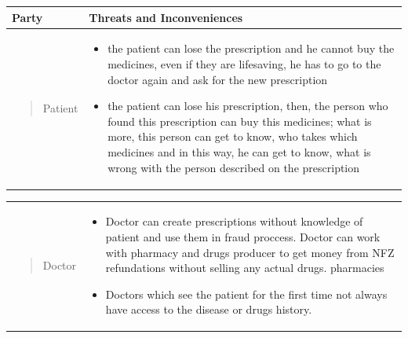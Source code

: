 \begin{table}[h]
    \begin{tabular}{| p{3cm} | p{9cm} |}
    \hline
    \centering Party & Threats and Inconveniences \\ \hline
    \vspace*{\fill} \begin{quote} \centering Patient \end{quote} \vspace*{\fill} & \begin{itemize}
    \item the patient can lose the prescription and he cannot
    buy the medicines, even if they are lifesaving,
    he has to go to the doctor again and ask
    for the new prescription \newline
    \item the patient can lose his prescription, then, the
    person who found this prescription can buy this
    medicines; what is more, this person can get to
    know, who takes which medicines and in this
    way, he can get to know, what is wrong with
    the person described on the prescription
    
    \end{itemize}
    \\ \hline
    \end{tabular}
      \begin{tabular}{| p{3cm} | p{9cm} |}
    \hline
    \vspace*{\fill} \begin{quote} \centering Doctor  \end{quote} \vspace*{\fill} & \begin{itemize}
    \item Doctor can create prescriptions without knowledge of patient and use them in fraud proccess.
    Doctor can work with pharmacy and drugs producer to get money from NFZ refundations without selling any actual drugs.
    pharmacies \newline
    \item Doctors which see the patient for the first time not always have access to the disease or drugs history.


\end{itemize}
\end{tabular}
\end{table}
